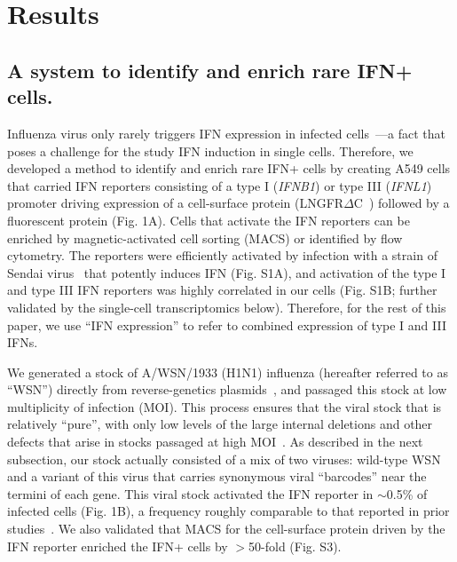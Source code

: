 \documentclass[]{article}
\begin{document}
\section*{Results}

\subsection*{A system to identify and enrich rare IFN+ cells.}



Influenza virus only rarely triggers IFN expression in infected cells~\cite{killip2017single, russell2018extreme, kallfass2013visualizing}---a fact that poses a challenge for the study IFN induction in single cells.
Therefore, we developed a method to identify and enrich rare IFN+ cells by creating A549 cells that carried IFN reporters consisting of a type I (\textit{IFNB1}) or type III (\textit{IFNL1}) promoter driving expression of a cell-surface protein (LNGFR$\Delta$C~\cite{bonini1997hsv,ruggieri1997cell}) followed by a fluorescent protein (Fig. 1A).
Cells that activate the IFN reporters can be enriched by magnetic-activated cell sorting (MACS) or identified by flow cytometry.
The reporters were efficiently activated by infection with a strain of Sendai virus~\cite{strahle2006sendai} that potently induces IFN (Fig. S1A), and activation of the type I and type III IFN reporters was highly correlated in our cells (Fig. S1B; further validated by the single-cell transcriptomics below).
Therefore, for the rest of this paper, we use ``IFN expression'' to refer to combined expression of type I and III IFNs. 

We generated a stock of A/WSN/1933 (H1N1) influenza (hereafter referred to as ``WSN'') directly from reverse-genetics plasmids~\cite{hoffmann2000dna}, and passaged this stock at low multiplicity of infection (MOI).
This process ensures that the viral stock that is relatively ``pure'', with only low levels of the large internal deletions and other defects that arise in stocks passaged at high MOI~\cite{xue2016propagation}.
As described in the next subsection, our stock actually consisted of a mix of two viruses: wild-type WSN and a variant of this virus that carries synonymous viral ``barcodes'' near the termini of each gene.
This viral stock activated the IFN reporter in $\sim$0.5\% of infected cells  (Fig. 1B), a frequency roughly comparable to that reported in prior studies~\cite{killip2017single, russell2018extreme}.
We also validated that MACS for the cell-surface protein driven by the IFN reporter enriched the IFN+ cells by $>$50-fold (Fig. S3).
\end{document}
